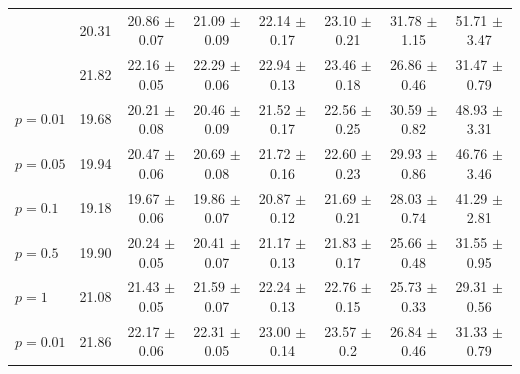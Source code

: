 \begin{table}
\begin{tabular}{|l | c | c | c | c | c | c | c |}
		\Clipping[$0.1$] & 20.31 & 20.86 {\color{gray}\scriptsize ${\pm}$0.07} & 21.09 {\color{gray}\scriptsize ${\pm}$0.09} & 22.14 {\color{gray}\scriptsize ${\pm}$0.17} & 23.10 {\color{gray}\scriptsize ${\pm}$0.21} & 31.78 {\color{gray}\scriptsize ${\pm}$1.15} & 51.71 {\color{gray}\scriptsize ${\pm}$3.47}\\
		\Clipping[$0.05$] & 21.82 & 22.16 {\color{gray}\scriptsize ${\pm}$0.05} & 22.29 {\color{gray}\scriptsize ${\pm}$0.06} & 22.94 {\color{gray}\scriptsize ${\pm}$0.13} & 23.46 {\color{gray}\scriptsize ${\pm}$0.18} & 26.86 {\color{gray}\scriptsize ${\pm}$0.46} & 31.47 {\color{gray}\scriptsize ${\pm}$0.79}\\
		\hline
		\Random[$0.1$] $p{=}0.01$ & 19.68 & 20.21 {\color{gray}\scriptsize ${\pm}$0.08} & 20.46 {\color{gray}\scriptsize ${\pm}$0.09} & 21.52 {\color{gray}\scriptsize ${\pm}$0.17} & 22.56 {\color{gray}\scriptsize ${\pm}$0.25} & 30.59 {\color{gray}\scriptsize ${\pm}$0.82} & 48.93 {\color{gray}\scriptsize ${\pm}$3.31}\\
		\Random[$0.1$] $p{=}0.05$ & 19.94 & 20.47 {\color{gray}\scriptsize ${\pm}$0.06} & 20.69 {\color{gray}\scriptsize ${\pm}$0.08} & 21.72 {\color{gray}\scriptsize ${\pm}$0.16} & 22.60 {\color{gray}\scriptsize ${\pm}$0.23} & 29.93 {\color{gray}\scriptsize ${\pm}$0.86} & 46.76 {\color{gray}\scriptsize ${\pm}$3.46}\\
		\Random[$0.1$] $p{=}0.1$ & 19.18 & 19.67 {\color{gray}\scriptsize ${\pm}$0.06} & 19.86 {\color{gray}\scriptsize ${\pm}$0.07} & 20.87 {\color{gray}\scriptsize ${\pm}$0.12} & 21.69 {\color{gray}\scriptsize ${\pm}$0.21} & 28.03 {\color{gray}\scriptsize ${\pm}$0.74} & 41.29 {\color{gray}\scriptsize ${\pm}$2.81}\\
		\Random[$0.1$] $p{=}0.5$ & 19.90 & 20.24 {\color{gray}\scriptsize ${\pm}$0.05} & 20.41 {\color{gray}\scriptsize ${\pm}$0.07} & 21.17 {\color{gray}\scriptsize ${\pm}$0.13} & 21.83 {\color{gray}\scriptsize ${\pm}$0.17} & 25.66 {\color{gray}\scriptsize ${\pm}$0.48} & 31.55 {\color{gray}\scriptsize ${\pm}$0.95}\\
		\Random[$0.1$] $p{=}1$ & 21.08 & 21.43 {\color{gray}\scriptsize ${\pm}$0.05} & 21.59 {\color{gray}\scriptsize ${\pm}$0.07} & 22.24 {\color{gray}\scriptsize ${\pm}$0.13} & 22.76 {\color{gray}\scriptsize ${\pm}$0.15} & 25.73 {\color{gray}\scriptsize ${\pm}$0.33} & 29.31 {\color{gray}\scriptsize ${\pm}$0.56}\\
		\Random[$0.05$] $p{=}0.01$ & 21.86 & 22.17 {\color{gray}\scriptsize ${\pm}$0.06} & 22.31 {\color{gray}\scriptsize ${\pm}$0.05} & 23.00 {\color{gray}\scriptsize ${\pm}$0.14} & 23.57 {\color{gray}\scriptsize ${\pm}$0.2} & 26.84 {\color{gray}\scriptsize ${\pm}$0.46} & 31.33 {\color{gray}\scriptsize ${\pm}$0.79}\\

\end{tabular}
\end{table}
